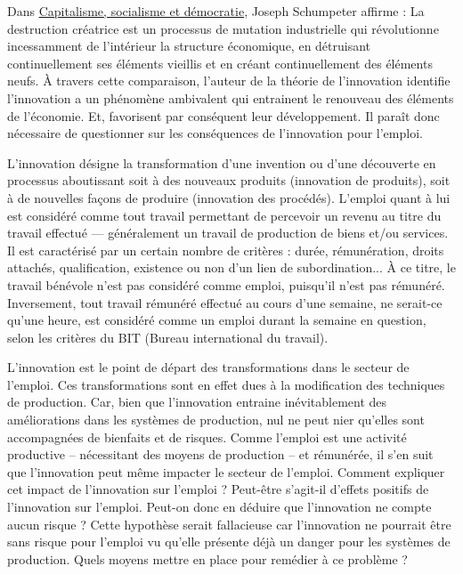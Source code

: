 

	\hspace*{.5cm}Dans \underline{Capitalisme, socialisme et démocratie}, Joseph Schumpeter affirme : \guillemetleft La destruction créatrice est un processus de mutation industrielle qui révolutionne incessamment de l'intérieur la structure économique, en détruisant continuellement ses éléments vieillis et en créant continuellement des éléments neufs. \guillemetright À travers cette comparaison, l'auteur de la théorie de l'innovation identifie l'innovation a un phénomène ambivalent qui entrainent le renouveau des éléments de l'économie. Et, favorisent par conséquent leur développement. Il paraît donc nécessaire de questionner sur les conséquences de l'innovation pour l'emploi.
	
	\hspace*{.5cm}L'innovation désigne la transformation d'une invention ou d'une découverte en processus aboutissant soit à des nouveaux produits (innovation de produits), soit à de nouvelles façons de produire (innovation des procédés). L'emploi quant à lui est considéré comme tout travail permettant de percevoir un revenu au titre du travail effectué — généralement un travail de production de biens et/ou services. Il est caractérisé par un certain nombre de critères : durée, rémunération, droits attachés, qualification, existence ou non d'un lien de subordination... À ce titre, le travail bénévole n'est pas considéré comme emploi, puisqu'il n'est pas rémunéré. Inversement, tout travail rémunéré effectué au cours d'une semaine, ne serait-ce qu'une heure, est considéré comme un emploi durant la semaine en question, selon les critères du BIT (Bureau international du travail). 
	
	\hspace*{.5cm}L'innovation est le point de départ des transformations dans le secteur de l'emploi. Ces transformations sont en effet dues à la modification des techniques de production. Car, bien que l'innovation entraine inévitablement des améliorations dans les systèmes de production, nul ne peut nier qu'elles sont accompagnées de bienfaits et de risques. Comme l'emploi est une activité productive – nécessitant des moyens de production – et rémunérée, il s'en suit que l'innovation peut même impacter le secteur de l'emploi. Comment expliquer cet impact de l'innovation sur l'emploi ? Peut-être s'agit-il d'effets positifs de l'innovation sur l'emploi. Peut-on donc en déduire que l'innovation ne compte aucun risque ? Cette hypothèse serait fallacieuse car l'innovation ne pourrait être sans risque pour l'emploi vu qu'elle présente déjà un danger pour les systèmes de production. Quels moyens mettre en place pour remédier à ce problème ?
	
